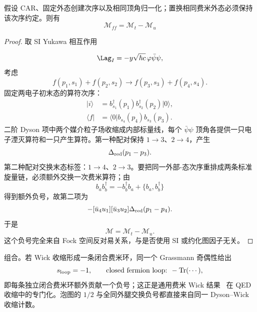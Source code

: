 \begin{proposition}[相同费米外态的反对称符号]
假设 CAR、固定外态创建次序以及相同顶角归一化；置换相同费米外态必须保持该次序约定。则有
\begin{equation}
 \mathcal M_{ff}=\mathcal M_t-\mathcal M_u
\label{eq:identical-fermion-exchange-sign-dp68}
\end{equation}
\end{proposition}
\begin{proof}
取 SI Yukawa 相互作用

\begin{equation*}
 \Lag_I=-y\sqrt{\hbar c}\,\varphi\bar\psi\psi,
\end{equation*}
考虑
\begin{equation*}
 f(p_1,s_1)+f(p_2,s_2)
 \to
 f(p_3,s_3)+f(p_4,s_4).
\end{equation*}
固定两电子初末态的算符次序：
\begin{align*}
 |i\rangle
 &=b_{s_1}^\dagger(p_1)b_{s_2}^\dagger(p_2)|0\rangle,\\
 \langle f|
 &=\langle0|b_{s_4}(p_4)b_{s_3}(p_3).
\end{align*}
二阶 Dyson 项中两个媒介粒子场收缩成内部标量线，每个 $\bar\psi\psi$ 顶角各提供一只电子湮灭算符和一只产生算符。第一种配对保持 $1\to3$、$2\to4$，产生
\begin{equation*}
 [\bar u_3u_1][\bar u_4u_2]
 \Delta_{\rm red}(p_1-p_3).
\end{equation*}
第二种配对交换末态标签：$1\to4$、$2\to3$。要把同一外部-态次序重排成两条标准旋量链，必须额外交换一次费米算符；由
\begin{equation*}
 b_a b_b^\dagger
 =-b_b^\dagger b_a+\{b_a,b_b^\dagger\}
\end{equation*}
得到额外负号，故第二项为
\begin{equation*}
 -[\bar u_4u_1][\bar u_3u_2]
 \Delta_{\rm red}(p_1-p_4).
\end{equation*}
于是
\begin{equation*}
 {\mathcal M=\mathcal M_t-\mathcal M_u.}
\end{equation*}
这个负号完全来自 Fock 空间反对易关系，与是否使用 SI 或约化图因子无关。
\end{proof}

组合。若 Wick 收缩形成一条闭合费米环，同一个 Grassmann 奇偶性给出
\begin{equation}
 s_{\rm loop}=-1,\qquad \text{closed fermion loop: }-\operatorname{Tr}(\cdots),
 \label{eq:closed-fermion-loop-sign-dp68}
\end{equation}
即每条独立闭合费米环额外贡献一个负号；这正是通用费米 Wick 结果~ 在 QED 收缩中的专门化。泡图的 $1/2$ 与全同外腿交换负号都直接来自同一 Dyson--Wick 收缩计数。

